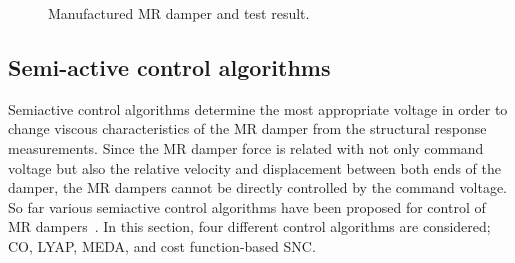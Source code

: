 \begin{figure}[!ht]
\centering
{}

\caption{Manufactured MR damper and test result.}
\label{fig:n3-6}
\end{figure}

\subsection{Semi-active control algorithms}

Semiactive control algorithms determine the most appropriate voltage in order to change viscous characteristics of the MR damper from the structural response measurements. Since the MR damper force is related with not only command voltage but also the relative velocity and displacement between both ends of the damper, the MR dampers cannot be directly controlled by the command voltage. So far various semiactive control algorithms have been proposed for control of MR dampers~\citep{jansen2000semiactive}. In this section, four different control algorithms are considered; CO, LYAP, MEDA, and cost function-based SNC.

